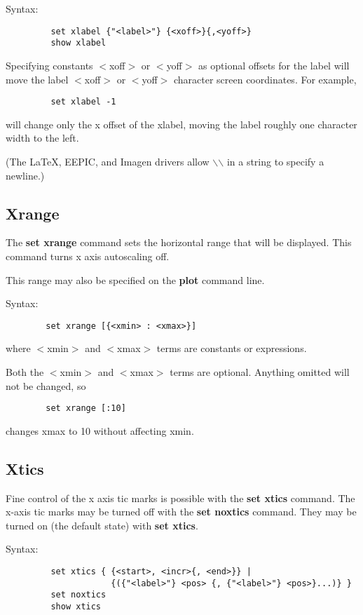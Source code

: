 Syntax: 
\begin{verbatim}
         set xlabel {"<label>"} {<xoff>}{,<yoff>}
         show xlabel
\end{verbatim}

Specifying constants $<$xoff$>$ or $<$yoff$>$ as optional offsets for the
label will move the label $<$xoff$>$ or $<$yoff$>$ character screen
coordinates. For example,

\begin{verbatim}
         set xlabel -1
\end{verbatim}

will change only the x offset of the xlabel, moving the label roughly
one character width to the left.

(The LaTeX, EEPIC, and Imagen drivers allow $\backslash$$\backslash$ in a string to specify
a newline.)
\subsection{Xrange}
The {\bf set xrange} command sets the horizontal range that will be
displayed. This command turns x axis autoscaling off.

This range may also be specified on the {\bf plot} command line.

Syntax:
\begin{verbatim}
        set xrange [{<xmin> : <xmax>}]
\end{verbatim}

where $<$xmin$>$ and $<$xmax$>$ terms are constants or expressions.

Both the $<$xmin$>$ and $<$xmax$>$ terms are optional. Anything omitted will
not be changed, so 
\begin{verbatim}
        set xrange [:10]
\end{verbatim}
changes xmax to 10 without affecting xmin.
\subsection{Xtics}
Fine control of the x axis tic marks is possible with the
{\bf set xtics} command. The x-axis tic marks may be turned off with the
{\bf set noxtics} command. They may be turned on (the default state) with
{\bf set xtics}.

Syntax:
\begin{verbatim}
         set xtics { {<start>, <incr>{, <end>}} |
                     {({"<label>"} <pos> {, {"<label>"} <pos>}...)} }
         set noxtics
         show xtics
\end{verbatim}

